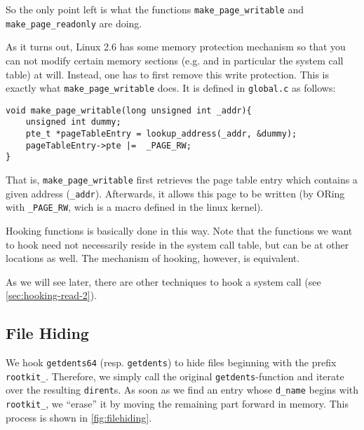 \documentclass[10pt, letterpaper]{scrartcl}
\newcommand{\todo}[1]{\textcolor{red}{TODO: #1}}
\begin{document}
So the only point left is what the functions \texttt{make\_page\_writable} and \texttt{make\_page\_readonly} are doing.

As it turns out, Linux 2.6 has some memory protection mechanism so that you can not modify certain memory sections (e.g. and in particular the system call table) at will. Instead, one has to first remove this write protection. This is exactly what \texttt{make\_page\_writable} does. It is defined in \texttt{global.c} as follows:

\begin{verbatim}
void make_page_writable(long unsigned int _addr){
    unsigned int dummy;
    pte_t *pageTableEntry = lookup_address(_addr, &dummy);
    pageTableEntry->pte |=  _PAGE_RW;
}
\end{verbatim}

That is, \texttt{make\_page\_writable} first retrieves the page table entry which contains a given address (\texttt{\_addr}). Afterwards, it allows this page to be written (by ORing with \texttt{\_PAGE\_RW}, wich is a macro defined in the linux kernel). %

Hooking functions is basically done in this way. Note that the functions we want to hook need not necessarily reside in the system call table, but can be at other locations as well. The mechanism of hooking, however, is equivalent.

As we will see later, there are other techniques to hook a system call (see \autoref{sec:hooking-read-2}).

\subsection{File Hiding}
\label{filehiding}

We hook \texttt{getdents64} (resp. \texttt{getdents}) to hide files beginning with the prefix \texttt{rootkit\_}. 
Therefore, we simply call the original \texttt{getdents}-function and iterate over the resulting
\texttt{dirent}s. As soon as we find an entry whose \texttt{d\_name} begins with \texttt{rootkit\_},
we ``erase'' it by moving the remaining part forward in memory. This process is shown in \autoref{fig:filehiding}.
\end{document}
